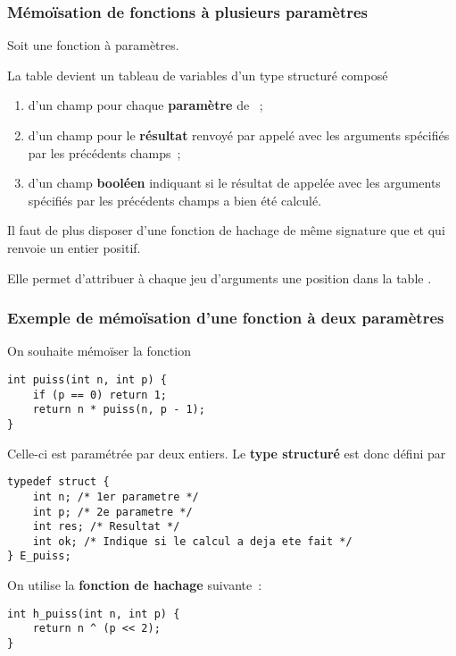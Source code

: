\begin{frame}[fragile]
\frametitle{Mémoïsation de fonctions à plusieurs paramètres}
Soit  une fonction à  paramètres.
\bigskip

La table  devient un \alert{tableau de variables d'un type structuré}
 composé
\begin{enumerate}
    \item d'un champ pour chaque {\bf paramètre} de ~;
    \item d'un champ pour le {\bf résultat} renvoyé par  appelé
    avec les arguments spécifiés par les précédents champs~;
    \item d'un champ {\bf booléen} indiquant si le résultat de 
    appelée avec les arguments spécifiés par les précédents champs a bien
    été calculé.
\end{enumerate}
\bigskip

Il faut de plus disposer d'une \alert{fonction de hachage} 
de même signature que  et qui renvoie un entier positif.
\medskip

Elle permet d'attribuer à chaque jeu d'arguments une position dans la
table .
\end{frame}

\begin{frame}[fragile]
\frametitle{Exemple de mémoïsation d'une fonction à deux paramètres}
On souhaite mémoïser la fonction
\begin{lstlisting}
int puiss(int n, int p) {
    if (p == 0) return 1;
    return n * puiss(n, p - 1);
}
\end{lstlisting}
\medskip

Celle-ci est paramétrée par deux entiers. Le {\bf type structuré}
 est donc défini par
\begin{lstlisting}
typedef struct {
    int n; /* 1er parametre */
    int p; /* 2e parametre */
    int res; /* Resultat */
    int ok; /* Indique si le calcul a deja ete fait */
} E_puiss;
\end{lstlisting}
\medskip

On utilise la {\bf fonction de hachage} suivante~:
\begin{lstlisting}
int h_puiss(int n, int p) {
    return n ^ (p << 2);
}
\end{lstlisting}
\end{frame}

